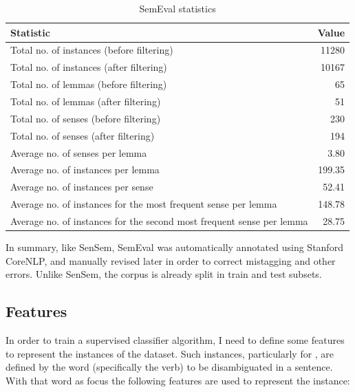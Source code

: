 \begin{table}[ht]
  \centering
  \begin{tabular}{lr}
    \toprule
    \textbf{Statistic} & \textbf{Value} \\
    \midrule
    Total no. of instances (before filtering) & 11280 \\
    Total no. of instances (after filtering) & 10167 \\
    Total no. of lemmas (before filtering) & 65 \\
    Total no. of lemmas (after filtering) & 51 \\
    Total no. of senses (before filtering) & 230 \\
    Total no. of senses (after filtering) & 194 \\
    \midrule
    Average no. of senses per lemma & 3.80 \\
    Average no. of instances per lemma & 199.35 \\
    Average no. of instances per sense & 52.41 \\
    Average no. of instances for the most frequent sense per lemma & 148.78 \\
    Average no. of instances for the second most frequent sense per lemma & 28.75 \\
    \bottomrule
  \end{tabular}
  \caption{SemEval statistics}
  \label{tab:semeval:stats}
\end{table}

In summary, like SenSem, SemEval was automatically annotated using Stanford
CoreNLP, and manually revised later in order to correct mistagging and other
errors. Unlike SenSem, the corpus is already split in train and test
subsets.

\subsection{Features}\label{sec:supervised:features}

In order to train a supervised classifier algorithm, I need to define some
features to represent the instances of the dataset. Such instances,
particularly for \vsd, are defined by the word (specifically the verb) to be
disambiguated in a sentence. With that word as focus the following features
are used to represent the instance:

